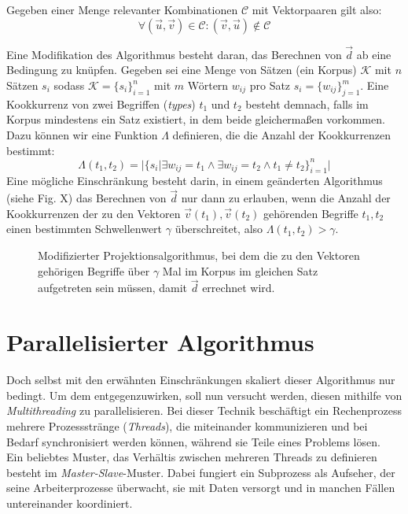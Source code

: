 Gegeben einer Menge relevanter Kombinationen $\mathcal{C}$ mit Vektorpaaren gilt also:
\begin{equation}
  \forall (\vec{u}, \vec{v}) \in \mathcal{C}: (\vec{v}, \vec{u}) \notin \mathcal{C}
\end{equation}

Eine Modifikation des Algorithmus besteht daran, das Berechnen von $\vec{d}$ ab eine Bedingung zu knüpfen.
Gegeben sei eine Menge von Sätzen (ein Korpus) $\mathcal{K}$ mit $n$ Sätzen $s_i$ sodass $\mathcal{K} = \{s_i\}_{i=1}^{n}$ mit
$m$ Wörtern $w_{ij}$ pro Satz $s_i = \{w_{ij}\}_{j=1}^m$. Eine Kookkurrenz von zwei Begriffen (\emph{types}) $t_1$ und $t_2$
besteht demnach, falls im Korpus mindestens ein Satz existiert, in dem beide gleichermaßen vorkommen. Dazu können wir
eine Funktion $\Lambda$ definieren, die die Anzahl der Kookkurrenzen bestimmt:
\begin{equation}
  \Lambda(t_1, t_2) = |\{s_i | \exists w_{ij} = t_1 \land \exists w_{ij} = t_2 \land t_1\neq t_2\}_{i=1}^{n}|
\end{equation}
Eine mögliche Einschränkung besteht darin, in einem geänderten Algorithmus (siehe Fig. X) das Berechnen von $\vec{d}$ nur
dann zu erlauben, wenn die Anzahl der Kookkurrenzen der zu den Vektoren $\vec{v}(t_1), \vec{v}(t_2)$ gehörenden Begriffe $t_1, t_2$
einen bestimmten Schwellenwert $\gamma$ überschreitet, also $\Lambda(t_1, t_2) > \gamma$.

\begin{figure}[h]
  \centering
  \begin{algorithm}[H]
  \end{algorithm}
  \caption[Modifizierter Projektionsalgorithmus]{Modifizierter Projektionsalgorithmus, bei dem die zu den Vektoren gehörigen
  Begriffe über $\gamma$ Mal im Korpus im gleichen Satz aufgetreten sein müssen, damit $\vec{d}$ errechnet wird.}
\end{figure}


\section{Parallelisierter Algorithmus}

Doch selbst mit den erwähnten Einschränkungen skaliert dieser Algorithmus nur bedingt. Um dem entgegenzuwirken, soll nun
versucht werden, diesen mithilfe von \emph{Multithreading} zu parallelisieren. Bei dieser Technik beschäftigt ein Rechenprozess
mehrere Prozessstränge (\emph{Threads}), die miteinander kommunizieren und bei Bedarf synchronisiert werden können,
während sie Teile eines Problems lösen.\\
Ein beliebtes Muster, das Verhältis zwischen mehreren Threads zu definieren besteht im \emph{Master-Slave}-Muster.
Dabei fungiert ein Subprozess als Aufseher, der seine Arbeiterprozesse überwacht, sie mit Daten versorgt und in manchen
Fällen untereinander koordiniert.\\ \\

